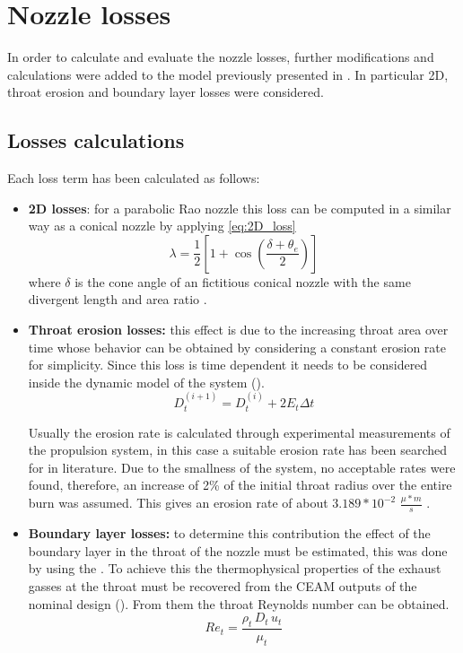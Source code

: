\section{Nozzle losses}
\label{sec:nozzle_losses}

In order to calculate and evaluate the nozzle losses, further modifications and calculations were added to the model previously presented in \mref.
In particular 2D, throat erosion and boundary layer losses were considered.

\subsection{Losses calculations}  

Each loss term has been calculated as follows:
\begin{itemize}
    \item \textbf{2D losses}: for a parabolic Rao nozzle this loss can be computed in a similar way as a conical nozzle by applying \autoref{eq:2D_loss}
    \begin{equation}
        \lambda = \frac{1}{2} \left[ 1 + \cos \left( \frac{\delta + \theta_e}{2}\right)\right]
        \label{eq:2D_loss}
    \end{equation}
    where $\delta$ is the cone angle of an fictitious conical nozzle with the same divergent length and area ratio \cite{Sutton}.
    \item \textbf{Throat erosion losses:} this effect is due to the increasing throat area over time whose behavior can be obtained by considering a constant erosion rate for simplicity. Since this loss is time dependent it needs to be considered inside the dynamic model of the system (\mref).
    \begin{equation}
        D_t^{(i+1)} = D_t^{(i)} + 2 E_t \Delta t
    \end{equation}

    Usually the erosion rate is calculated through experimental measurements of the propulsion system, in this case a suitable erosion rate has been searched for in literature. Due to the smallness of the system, no acceptable rates were found, therefore, an increase of 2\% of the initial throat radius over the entire burn was assumed\cite{Sutton}\cite{tesi_malesia}. This gives an erosion rate of about $3.189*10^{-2}$ $\frac{\mu*m}{s}$ \mref.
    \item \textbf{Boundary layer losses:} to determine this contribution the effect of the boundary layer in the throat of the nozzle must be estimated, this was done by using the . To achieve this the thermophysical properties of the exhaust gasses at the throat must be recovered from the CEAM outputs of the nominal design (\mref). From them the throat Reynolds number can be obtained.
    \begin{equation}
        Re_t = \frac{\rho_t \, D_t \, u_t}{\mu_t}
    \end{equation}


\end{itemize}
